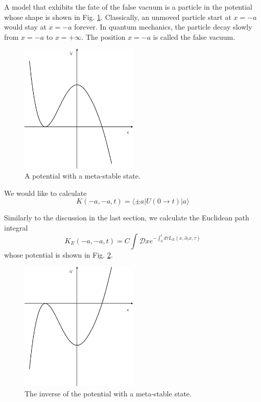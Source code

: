 \documentclass[12pt]{book}
\begin{document}
	A model that exhibits the fate of the false vacuum is a particle in the potential whose shape is shown in Fig. \ref{fig:metastable}. Classically, an unmoved particle start at $x=-a$ would stay at $x=-a$ forever. In quantum mechanics, the particle decay slowly from $x=-a$ to $x=+\infty$. The position $x=-a$ is called the false vacuum.
	\begin{figure}[htb!]
		\centering  
		\includegraphics[width=0.5\textwidth]{resources/chap_path_int/metastable.pdf}
		\caption{A potential with a meta-stable state.}
		\label{fig:metastable} 
	\end{figure}
	
	We would like to calculate
	\begin{equation}
		K(-a,-a,t)=\langle \pm a|U(0\rightarrow t)|a\rangle
	\end{equation}
	
	Similarly to the discussion in the last section, we calculate the Euclidean path integral
	\begin{equation}
		K_E(-a,-a,t)=C\int \mathcal Dxe^{-\int_{0}^{t}d\tau L_E(x,\partial_\tau x,\tau)}
	\end{equation}
	whose potential is shown in Fig. \ref{fig:invmetastable}.
	\begin{figure}[htb!]
		\centering  
		\includegraphics[width=0.5\textwidth]{resources/chap_path_int/invmetastable.pdf}
		\caption{The inverse of the potential with a meta-stable state.}
		\label{fig:invmetastable} 
	\end{figure}
	
\end{document}

